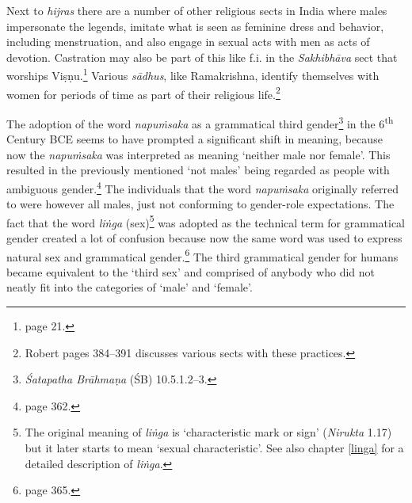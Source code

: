 Next to {\em hijras} there are a number of other religious sects in India where males impersonate the legends, imitate what is seen as feminine dress and behavior, including menstruation, and also engage in sexual acts with men as acts of devotion. Castration may also be part of this like f.i. in the {\em Sakhibhāva} sect that worships Viṣṇu.\footnote{\cite{nanda} page 21.} Various {\em sādhus}, like Ramakrishna, identify themselves with women for periods of time as part of their religious life.\footnote{Robert \cite{goldman} pages 384–391 discusses various sects with these practices.} 

The adoption of the word {\em napuṁsaka} as a grammatical third gender\footnote{{\em Śatapatha Brāhmaṇa} (ŚB) 10.5.1.2–3.} in the 6\textsuperscript{th} Century BCE seems to have prompted a significant shift in meaning, because now the {\em napuṁsaka} was interpreted as meaning `neither male nor female'. This resulted in the previously mentioned `not males' being regarded as people with ambiguous gender.\footnote{\cite{zwilling2000} page 362.} The individuals that the word {\em napuṁsaka} originally referred to were however all males, just not conforming to gender-role expectations. The fact that the word {\em liṅga} (sex)\footnote{The original meaning of {\em liṅga} is `characteristic mark or sign' ({\em Nirukta} 1.17) but it later starts to mean `sexual characteristic'. See also chapter \ref{linga} for a detailed description of {\em liṅga}.} was adopted as the technical term for grammatical gender created a lot of confusion because now the same word was used to express natural sex and grammatical gender.\footnote{\cite{zwilling} page 365.} The third grammatical gender for humans became equivalent to the `third sex' and comprised of anybody who did not neatly fit into the categories of `male' and `female'.


